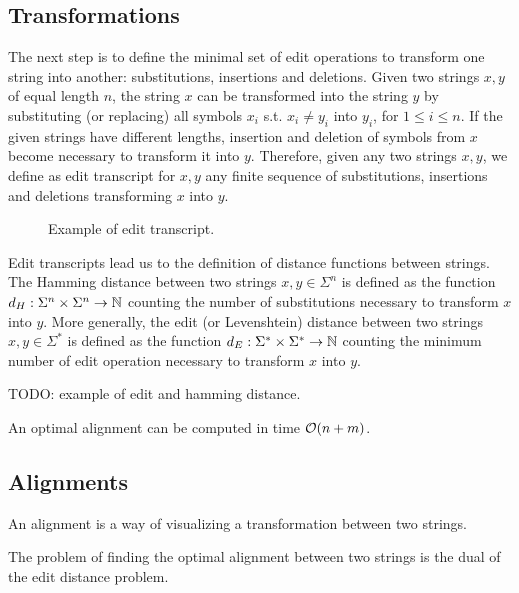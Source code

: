 \subsection{Transformations}

The next step is to define the minimal set of edit operations to transform one string into another: substitutions, insertions and deletions.
Given two strings $x,y$ of equal length $n$, the string $x$ can be transformed into the string $y$ by substituting (or replacing) all symbols $x_i$ s.t. $x_i \neq y_i$ into $y_i$, for $1 \leq i \leq n$.
If the given strings have different lengths, insertion and deletion of symbols from $x$ become necessary to transform it into $y$.
Therefore, given any two strings $x,y$, we define as edit transcript for $x,y$ any finite sequence of substitutions, insertions and deletions transforming $x$ into $y$.

\begin{figure}[h]
\begin{center}
\caption{Example of edit transcript.}
\label{fig:edit-transcript}

\end{center}
\end{figure}

Edit transcripts lead us to the definition of distance functions between strings.
The Hamming distance between two strings $x,y \in \Sigma^{n}$ is defined as the function $d_H : \Sigma^{n} \times \Sigma^{n} \rightarrow \mathbb {N}$ counting the number of substitutions necessary to transform $x$ into $y$.
More generally, the edit (or Levenshtein) distance between two strings $x,y \in \Sigma^{*}$ is defined as the function $d_E : \Sigma^{*} \times \Sigma^{*} \rightarrow \mathbb {N}$ counting the minimum number of edit operation necessary to transform $x$ into $y$.

\begin{example}
TODO: example of edit and hamming distance.
\end{example}

An optimal alignment can be computed in time $\mathcal{O}(n + m)$.

\subsection{Alignments}

An alignment is a way of visualizing a transformation between two strings.

The problem of finding the optimal alignment between two strings is the dual of the edit distance problem.

